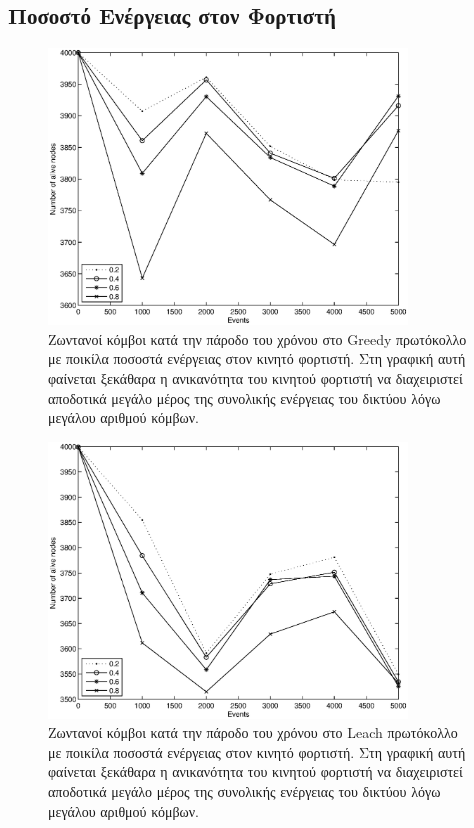 \subsection{Ποσοστό Ενέργειας στον Φορτιστή}\label{subc:result6_3}
\begin{figure}[H]
  \centering
  \includegraphics[width=0.85\textwidth]{experiments/4000nodes/3.smallVSbigpercentage/alive_nodes_greedy_rc_per_our.eps}
  \caption{Ζωντανοί κόμβοι κατά την πάροδο του χρόνου στο Greedy πρωτόκολλο με ποικίλα ποσοστά ενέργειας στον κινητό φορτιστή. Στη γραφική αυτή φαίνεται ξεκάθαρα η
ανικανότητα του κινητού φορτιστή να διαχειριστεί αποδοτικά μεγάλο μέρος της συνολικής ενέργειας του δικτύου λόγω μεγάλου αριθμού κόμβων.}
  \label{fig:5_3exp_1_1}
\end{figure}

\begin{figure}[H]
  \centering
   \includegraphics[width=0.85\textwidth]{experiments/4000nodes/3.smallVSbigpercentage/alive_nodes_leach_rc_per_our.eps}
  \caption{Ζωντανοί κόμβοι κατά την πάροδο του χρόνου στο Leach πρωτόκολλο με ποικίλα ποσοστά ενέργειας στον κινητό φορτιστή. Στη γραφική αυτή φαίνεται ξεκάθαρα η
ανικανότητα του κινητού φορτιστή να διαχειριστεί αποδοτικά μεγάλο μέρος της συνολικής ενέργειας του δικτύου λόγω μεγάλου αριθμού κόμβων.}
  \label{fig:5_3exp_1_2}
\end{figure}

